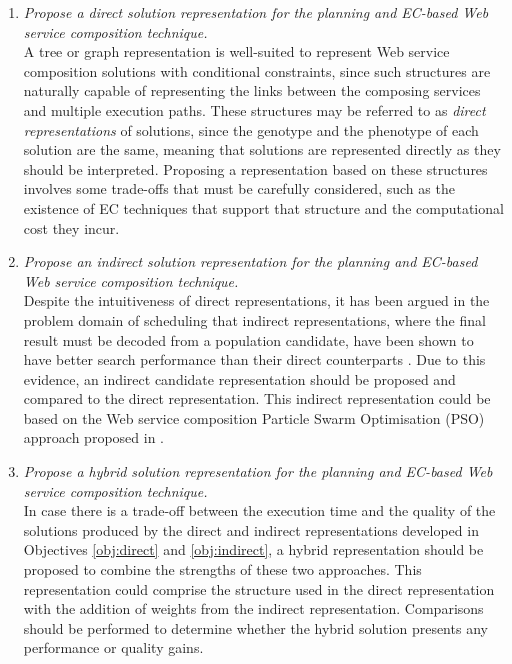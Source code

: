 \begin{enumerate}
  \begin{enumerate}
    \item \label{obj:direct} \emph{Propose a direct solution representation for the planning and EC-based Web service composition technique.}\\
    A tree or graph representation is well-suited to represent Web service composition solutions with conditional constraints, since such structures are naturally capable of representing the links between the composing services and multiple execution paths. These structures may be referred to as \emph{direct representations} of solutions, since the genotype and the phenotype of each solution are the same, meaning that solutions are represented directly as they should be interpreted. Proposing a representation based on these structures involves some trade-offs that must be carefully considered, such as the existence of EC techniques that support that structure and the computational cost they incur.
    \item \label{obj:indirect} \emph{Propose an indirect solution representation for the planning and EC-based Web service composition technique.}\\
    Despite the intuitiveness of direct representations, it has been argued in the problem domain of scheduling that indirect representations, where the final result must be decoded from a population candidate, have been shown to have better search performance than their direct counterparts \cite{hart2005evolutionary,craenen2001handle}. Due to this evidence, an indirect candidate representation should be proposed and compared to the direct representation. This indirect representation could be based on the Web service composition Particle Swarm Optimisation (PSO) approach proposed in \cite{da2014graph}.
    \item \label{obj:hybrid} \emph{Propose a hybrid solution representation for the planning and EC-based Web service composition technique.}\\
    In case there is a trade-off between the execution time and the quality of the solutions produced by the direct and indirect representations developed in Objectives \ref{obj:direct} and \ref{obj:indirect}, a hybrid representation should be proposed to combine the strengths of these two approaches. This representation could comprise the structure used in the direct representation with the addition of weights from the indirect representation. Comparisons should be performed to determine whether the hybrid solution presents any performance or quality gains.
  \end{enumerate}
 

\end{enumerate}
